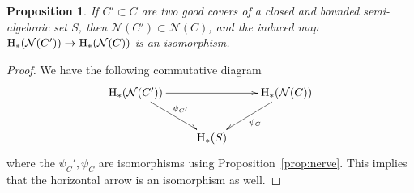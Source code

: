 \documentclass[10pt,a4paper]{amsart}
\newtheorem{proposition}{Proposition}
\newcommand{\HH}  {\mbox{\rm H}}
\newcommand{\Nerve}{\mathcal{N}}
\begin{document}
\begin{proposition}
\label{prop:refinement}
   If $C' \subset C$ are two good covers of a closed and bounded semi-algebraic set $S$, then $\Nerve(C') \subset \Nerve(C)$, and the induced
   map $\HH_*(\Nerve(C')) \rightarrow \HH_*(\Nerve(C))$ is an isomorphism.
\end{proposition}

\begin{proof}
    We have the following commutative diagram 
    \[
    \xymatrix{
\HH_*(\Nerve(C')) \ar[rr]\ar[rd]^{\psi_{C'}} && \HH_*(\Nerve(C)) \ar[ld]^{\psi_C} \\
    & \HH_*(S)&
    }
  \]
where the $\psi_C',\psi_C$ are isomorphisms using Proposition~\ref{prop:nerve}.
This implies that the horizontal arrow is an isomorphism as well.
\end{proof}
\end{document}
